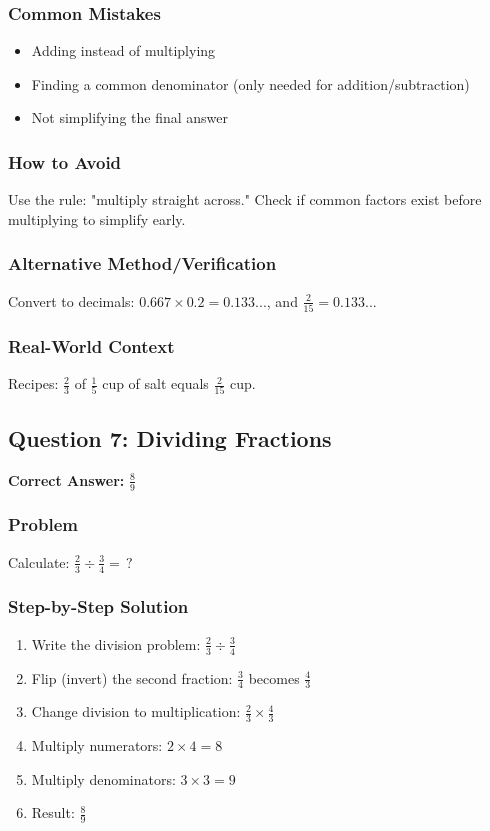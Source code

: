\documentclass[12pt,a4paper]{article}
\begin{document}
\subsubsection*{Common Mistakes}
\begin{itemize}
    \item Adding instead of multiplying
    \item Finding a common denominator (only needed for addition/subtraction)
    \item Not simplifying the final answer
\end{itemize}

\subsubsection*{How to Avoid}
Use the rule: "multiply straight across." Check if common factors exist before multiplying to simplify early.

\subsubsection*{Alternative Method/Verification}
Convert to decimals: $0.667 \times 0.2 = 0.133...$, and $\frac{2}{15} = 0.133...$ 

\subsubsection*{Real-World Context}
Recipes: $\frac{2}{3}$ of $\frac{1}{5}$ cup of salt equals $\frac{2}{15}$ cup.

\vspace{0.5cm}

\subsection*{Question 7: Dividing Fractions}

\textbf{Correct Answer:} $\frac{8}{9}$

\subsubsection*{Problem}
Calculate: $\frac{2}{3} \div \frac{3}{4} = \,?$

\subsubsection*{Step-by-Step Solution}
\begin{enumerate}
    \item Write the division problem: $\frac{2}{3} \div \frac{3}{4}$
    \item Flip (invert) the second fraction: $\frac{3}{4}$ becomes $\frac{4}{3}$
    \item Change division to multiplication: $\frac{2}{3} \times \frac{4}{3}$
    \item Multiply numerators: $2 \times 4 = 8$
    \item Multiply denominators: $3 \times 3 = 9$
    \item Result: $\frac{8}{9}$
\end{enumerate}
\end{document}
